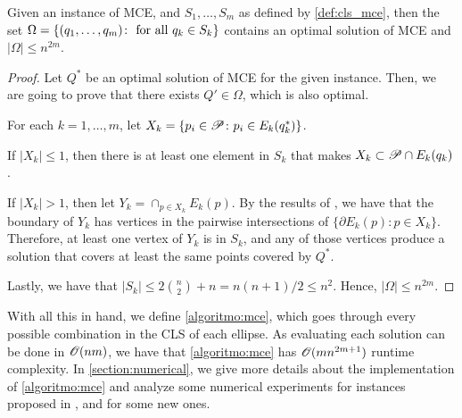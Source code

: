 \begin{thm}\label{thm:mce}
	Given an instance of MCE, and $S_1, \dots, S_m$ as defined by \autoref{def:cls_mce}, then the set $\Omega = \{(q_1, \dots, q_m) \colon \textnormal{ for all }q_k \in S_k \}$ contains an optimal solution of MCE and $|\Omega| \le n^{2m}$. 
\end{thm}
\begin{proof}
	Let $Q^*$ be an optimal solution of MCE for the given instance. Then, we are going to prove that there exists $Q' \in \Omega$, which is also optimal.
	
	For each $k=1, \dots, m$, let $X_k = \{p_i \in \mathscr{P}\colon p_i \in E_k(q_k^*)\}$.
	
	
	If $|X_k| \le 1$, then there is at least one element in $S_k$ that makes $X_k \subset \mathscr{P} \cap E_k(q_k)$.
	
	If $|X_k| > 1$, then let $Y_k = \cap_{p \in X_k}E_k(p)$. By the results of \cite{bi}, we have that the boundary of $Y_k$ has vertices in the pairwise intersections of $\{\partial E_k(p) \colon p \in X_k\}$. Therefore, at least one vertex of $Y_k$ is in $S_k$, and any of those vertices produce a solution that covers at least the same points covered by $Q^*$.
	
	Lastly, we have that $|S_k| \le 2\binom{n}{2} + n = n(n+1)/2 \le n^2$. Hence, $|\Omega| \le n^{2m}$.
\end{proof}

With all this in hand, we define \autoref{algoritmo:mce}, which goes through every possible combination in the CLS of each ellipse. As evaluating each solution can be done in $\mathscr{O}(nm)$, we have that \autoref{algoritmo:mce} has $\mathscr{O}(mn^{2m+1})$ runtime complexity. 
In \autoref{section:numerical}, we give more details about the implementation of \autoref{algoritmo:mce} and analyze some numerical experiments for instances proposed in \cite{canbolat, andreta}, and for some new ones.

